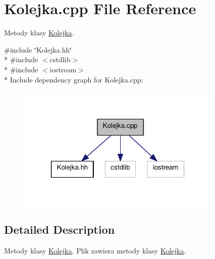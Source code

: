 \hypertarget{a00010}{\section{Kolejka.\-cpp File Reference}
\label{a00010}
}


Metody klasy \hyperlink{a00003}{Kolejka}.  


{\ttfamily \#include \char`\"{}Kolejka.\-hh\char`\"{}}\\*
{\ttfamily \#include $<$cstdlib$>$}\\*
{\ttfamily \#include $<$iostream$>$}\\*
Include dependency graph for Kolejka.\-cpp\-:\nopagebreak
\begin{figure}[H]
\begin{center}
\leavevmode
\includegraphics[width=276pt]{a00024}
\end{center}
\end{figure}


\subsection{Detailed Description}
Metody klasy \hyperlink{a00003}{Kolejka}. Plik zawiera metody klasy \hyperlink{a00003}{Kolejka}. 